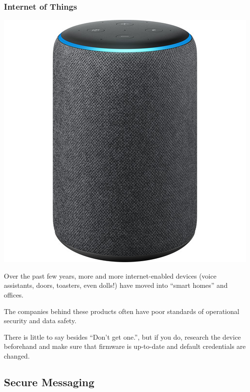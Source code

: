\documentclass[aspectratio=169,dvipsnames]{beamer}
\begin{document}
\begin{frame}
\frametitle{Internet of Things}

\begin{minipage}{0.4\textwidth}
\begin{center}
\includegraphics[scale=0.25,keepaspectratio]{images/alexa}
\end{center}
\end{minipage}%
\begin{minipage}{0.6\textwidth}
Over the past few years, more and more internet-enabled devices (voice assistants, doors, toasters, even dolls!) have moved into ``smart homes'' and offices.
\pause\medskip

The companies behind these products often have poor standards of operational security and data safety. 
\pause\medskip

There is little to say besides ``Don't get one.'', but if you do, research the device beforehand and make sure that firmware is up-to-date and default credentials are changed.
\end{minipage}
\end{frame}

\subsection{Secure Messaging}
\end{document}
